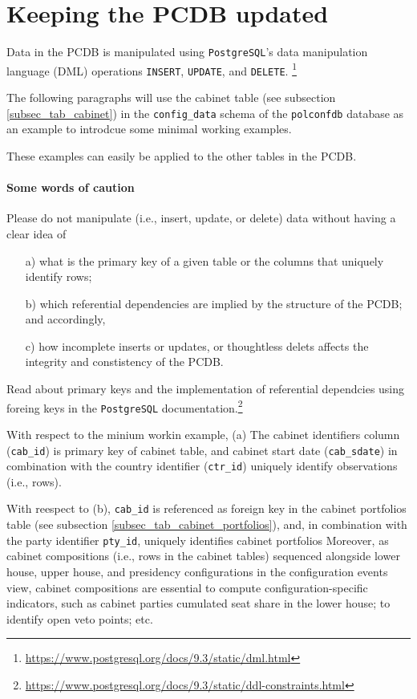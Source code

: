 \section{Keeping the PCDB updated}\label{sec_keeping_the_PCDB_updated}

Data in the PCDB is manipulated using \texttt{PostgreSQL}'s data manipulation language (DML) operations \texttt{INSERT}, \texttt{UPDATE}, and \texttt{DELETE}. \footnote{\url{https://www.postgresql.org/docs/9.3/static/dml.html}}

The following paragraphs will use the cabinet table (see subsection \ref{subsec_tab_cabinet}) in the \texttt{config\_data} schema of the \texttt{polconfdb} database as an example to introdcue some minimal working examples.

These examples can easily be applied to the other tables in the PCDB. 

\paragraph{Some words of caution} 
Please do not manipulate (i.e., insert, update, or delete) data without having a clear idea of 
\begin{itemize}
\item[a)]what is the primary key of a given table or the columns that uniquely identify rows;
\item[b)]which referential dependencies are implied by the structure of the PCDB; and accordingly,
\item[c)]how incomplete inserts or updates, or thoughtless delets affects the integrity and constistency of the PCDB.
\end{itemize}
Read about primary keys and the implementation of referential dependcies using foreing keys in the \texttt{PostgreSQL} documentation.\footnote{\url{https://www.postgresql.org/docs/9.3/static/ddl-constraints.html}}

With respect to the minium workin example, 
(a) The cabinet identifiers column (\texttt{cab\_id}) is primary key of cabinet table, and cabinet start date (\texttt{cab\_sdate}) in combination with the country identifier (\texttt{ctr\_id}) uniquely identify observations (i.e., rows). 

With reespect to (b), \texttt{cab\_id} is referenced as foreign key in the cabinet portfolios table (see subsection \ref{subsec_tab_cabinet_portfolios}), and, in combination with the party identifier \texttt{pty\_id}, uniquely identifies cabinet portfolios
Moreover, as cabinet compositions (i.e., rows in the cabinet tables) sequenced alongside lower house, upper house, and presidency configurations in the configuration events view, cabinet compositions are essential to compute configuration-specific indicators, such as cabinet parties cumulated seat share in the lower house; to identify open veto points; etc.

